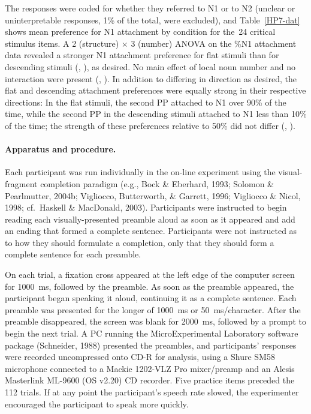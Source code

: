 \documentclass[12pt,titlepage]{article}
\newcommand{\IGNORE}[1]{} %
\newcommand{\showp}[1]{\IGNORE{#1}} %
\begin{document}
The responses were coded for whether they referred to N1 or to N2 (unclear
or uninterpretable responses, 1\% of the total\IGNORE{51 ratings out of
5133 (includes all stim and all 59 Ss)}, were excluded), and
Table~\ref{HP7-dat} shows mean preference for N1 attachment by condition
for the~24 critical stimulus items.  A 2 (structure) $\times$ 3 (number)
ANOVA on the \%N1 attachment data revealed a stronger N1 attachment
preference for flat stimuli than for descending stimuli
(, \showp{, \p{001}}), as desired.  No main
effect of local noun number and no interaction were present (\Fsweak[1.2],
\psweak[30]).  In addition to differing in direction as desired, the flat
and descending attachment preferences were equally strong in their
respective directions: In the flat stimuli, the second PP attached to N1
over 90\% of the time, while the second PP in the descending stimuli
attached to N1 less than 10\% of the time; the strength of these
preferences relative to 50\% did not differ (\Fweak[1.1], ).

\paragraph{Apparatus and procedure.} Each participant was run individually
in the on-line experiment using the visual-fragment completion paradigm
(e.g., Bock \& Eberhard, 1993; Solomon \& Pearlmutter, 2004b; Vigliocco,
Butterworth, \& Garrett, 1996; Vigliocco \& Nicol, 1998; cf.\ Haskell \&
MacDonald, 2003).  Participants were instructed to begin reading each
visually-presented preamble aloud as soon as it appeared and add an ending
that formed a complete sentence.  Participants were not instructed as to
how they should formulate a completion, only that they should form a
complete sentence for each preamble.

On each trial, a fixation cross appeared at the left edge of the computer
screen for 1000~ms, followed by the preamble.  As soon as the preamble
appeared, the participant began speaking it aloud, continuing it as a
complete sentence.  Each preamble was presented for the longer of 1000~ms
or 50~ms/character.  After the preamble disappeared, the screen was blank
for 2000~ms, followed by a prompt to begin the next trial.  A PC running
the MicroExperimental Laboratory software package (Schneider, 1988)
presented the preambles, and participants' responses were recorded
uncompressed onto CD-R for analysis, using a Shure SM58 microphone
connected to a Mackie 1202-VLZ Pro mixer/preamp and an Alesis Masterlink
ML-9600 (OS v2.20) CD recorder.  Five practice items preceded the 112
trials.  If at any point the participant's speech rate slowed, the
experimenter encouraged the participant to speak more quickly.
\end{document}
